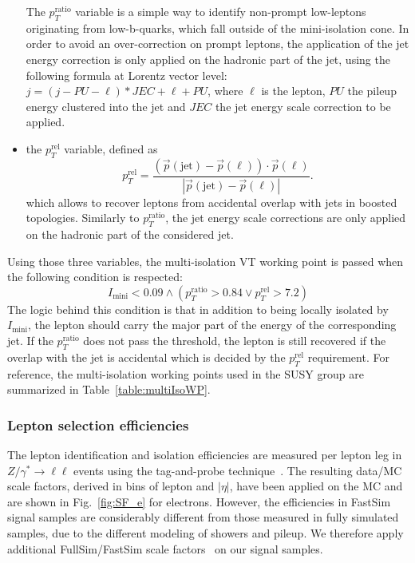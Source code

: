 \begin{itemize}
              The $p_T^\text{ratio}$ variable is a simple way to identify non-prompt low-\pt leptons originating from low-\pt b-quarks, which fall outside of the mini-isolation cone.
              In order to avoid an over-correction on prompt leptons, the application of the jet energy correction is only applied on the hadronic part of the jet, using the 
              following formula at Lorentz vector level: $j = (j - PU - \ell)*JEC + \ell + PU$, where $\ell$ is the lepton, 
              $PU$ the pileup energy clustered into the jet and $JEC$ the jet energy scale correction to be applied.
        \item the $p_T^\text{rel}$ variable, defined as
              \begin{equation}
                p_T^\text{rel} = \frac{\left(\vec{p}(\text{jet})-\vec{p}(\ell)\right) \cdot \vec{p}(\ell)}{|\vec{p}(\text{jet})-\vec{p}(\ell)|}.
              \end{equation}
              which allows to recover leptons from accidental overlap with jets in boosted topologies. Similarly to $p_T^\text{ratio}$, the jet energy scale corrections are only applied on the hadronic part of
              the considered jet.
      \end{itemize}
      Using those three variables, the multi-isolation VT working point is passed when the following condition is respected:
      \begin{equation}
        I_\text{mini} < 0.09 \wedge ( p_T^\text{ratio} > 0.84 \vee p_T^\text{rel} > 7.2 )
      \end{equation}
      The logic behind this condition is that in addition to being locally isolated by $I_\text{mini}$, the lepton should carry the major part of the energy of the corresponding jet. If the $p_T^\text{ratio}$ does
      not pass the threshold, the lepton is still recovered if the overlap with the jet is accidental which is decided by the $p_T^\text{rel}$ requirement.
      For reference, the multi-isolation working points used in the SUSY group are summarized in Table~\ref{table:multiIsoWP}.
      
    \subsubsection{Lepton selection efficiencies}
      The lepton identification and isolation efficiencies are measured per lepton leg in $Z/\gamma^*\rightarrow \ell\ell$ events using the tag-and-probe technique~\cite{twiki:SF}.
      The resulting data/MC scale factors, derived in bins of lepton \pt and $|\eta|$, have been applied on the MC and are shown in Fig.~\ref{fig:SF_e} for electrons.
      However, the efficiencies in FastSim signal samples are considerably different from those measured in fully simulated samples, due to the different modeling of showers and pileup.
      We therefore apply additional FullSim/FastSim scale factors~\citep{twiki:FSSF} on our signal samples.

